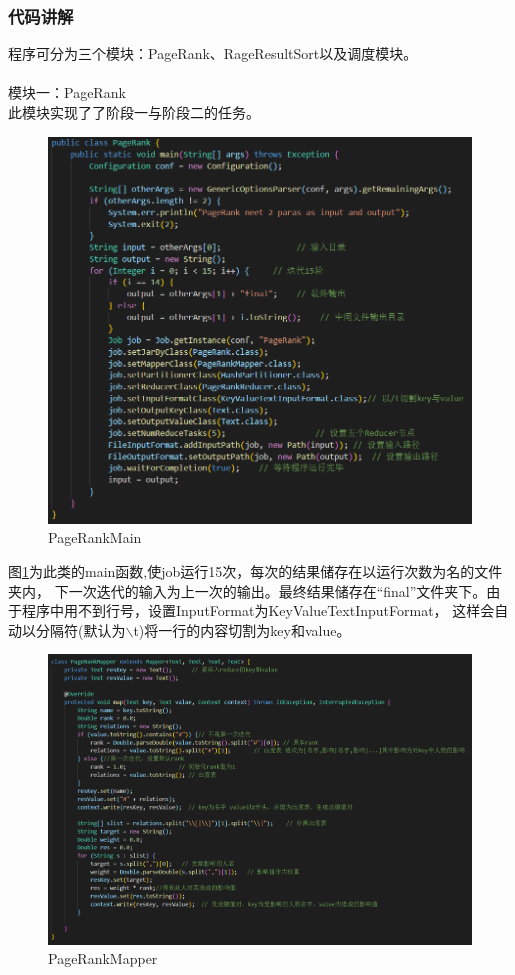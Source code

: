 \documentclass[a4paper,UTF8]{article}
\numberwithin{equation}{section}
\begin{document}
\subsubsection{代码讲解}
程序可分为三个模块：PageRank、RageResultSort以及调度模块。\\\\

模块一：PageRank\\
此模块实现了了阶段一与阶段二的任务。
\begin{figure}[H]
    \centering
    \includegraphics[width = 15cm]{PageRankMain.png}
    \caption{PageRankMain}
    \label{PageRankMain}
\end{figure}
图\ref{PageRankMain}为此类的main函数,使job运行15次，每次的结果储存在以运行次数为名的文件夹内，
下一次迭代的输入为上一次的输出。最终结果储存在“final”文件夹下。由于程序中用不到行号，设置InputFormat为KeyValueTextInputFormat，
这样会自动以分隔符(默认为$\backslash$t)将一行的内容切割为key和value。\\
\begin{figure}[H]
    \centering
    \includegraphics[width = 15cm]{PageRankMapper.png}
    \caption{PageRankMapper}
    \label{PageRankMapper}
\end{figure}
\end{document}

